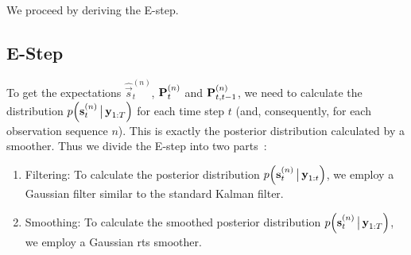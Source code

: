 	We proceed by deriving the E-step.

\subsection{E-Step}
	To get the expectations \( \hat{\vec{s}}_t^{(n)} \), \( \boldsymbol{\mathrm{P}}_{t}^{(n)} \) and \( \boldsymbol{\mathrm{P}}_{t, t - 1}^{(n)} \), we need to calculate the distribution \( p\Big(\boldsymbol{\mathrm{s}}_t^{(n)} \,\big\vert\, \boldsymbol{\mathrm{y}}_{1:T}\Big) \) for each time step \(t\) (and, consequently, for each observation sequence \(n\)). This is exactly the posterior distribution calculated by a smoother. Thus we divide the E-step into two parts~\cite{minkaHiddenMarkovModels1999}:
	\begin{enumerate}
		\item Filtering: To calculate the posterior distribution \( p\Big(\boldsymbol{\mathrm{s}}_t^{(n)} \,\big\vert\, \boldsymbol{\mathrm{y}}_{1:t}\Big) \), we employ a Gaussian filter similar to the standard Kalman filter.
		\item Smoothing: To calculate the smoothed posterior distribution \( p\Big(\boldsymbol{\mathrm{s}}_t^{(n)} \,\big\vert\, \boldsymbol{\mathrm{y}}_{1:T}\Big) \), we employ a Gaussian \ac{rts} smoother.
	\end{enumerate}

